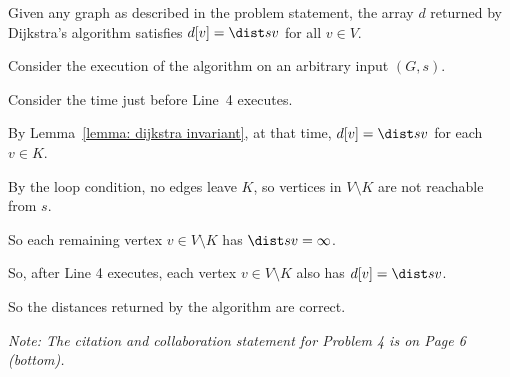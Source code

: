 \begin{theorem}
  Given any graph as described in the problem statement,
  the array $d$ returned by \textsf{Dijkstra}'s algorithm
  satisfies $d[v] = \dist s v$ for all $v\in V$.
\end{theorem}
\begin{longFormProof}

  \step Consider the execution of the algorithm on an arbitrary input $(G, s)$.

  \step Consider the time just before Line~4 executes.

  \step By Lemma~\ref{lemma: dijkstra invariant}, at that time, $d[v] = \dist s v$ for each $v\in K$.

  \step By the loop condition, no edges leave $K$, so vertices in $V\setminus K$ are not reachable from $s$.

  \step So each remaining vertex $v\in V\setminus K$ has $\dist s v = \infty$.

  \step So, after Line 4 executes, each vertex $v\in V\setminus K$ also has $d[v] = \dist s v$.

  \step So the distances returned by the algorithm are correct.

\end{longFormProof}


\vfill


\emph{Note: The citation and collaboration statement for Problem 4 is on Page 6 (bottom).}


